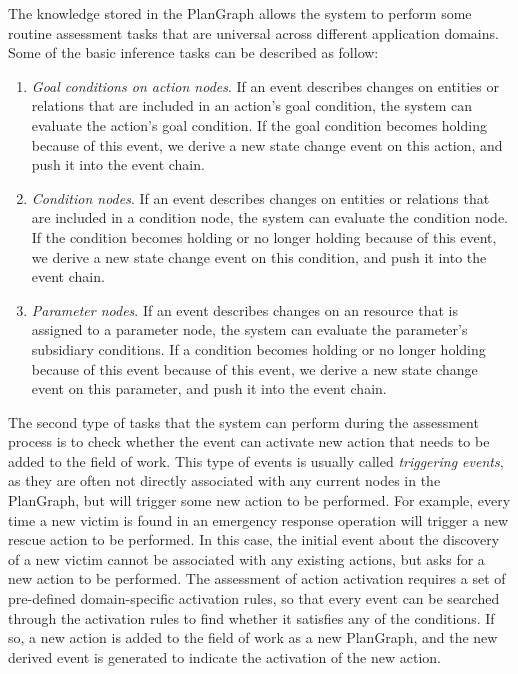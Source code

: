 The knowledge stored in the PlanGraph allows the system to perform some routine assessment tasks that are universal across different application domains. Some of the basic inference tasks can be described as follow:
\begin{enumerate}
	\item \emph{Goal conditions on action nodes}. If an event describes changes on entities or relations that are included in an action's goal condition, the system can evaluate the action's goal condition. If the goal condition becomes holding because of this event, we derive a new state change event on this action, and push it into the event chain.
	\item \emph{Condition nodes}. If an event describes changes on entities or relations that are included in a condition node, the system can evaluate the condition node. If the condition becomes holding or no longer holding because of this event, we derive a new state change event on this condition, and push it into the event chain. 
	\item \emph{Parameter nodes}. If an event describes changes on an resource that is assigned to a parameter node, the system can evaluate the parameter's subsidiary conditions. If a  condition becomes holding or no longer holding because of this event because of this event, we derive a new state change event on this parameter, and push it into the event chain.
\end{enumerate}

The second type of tasks that the system can perform during the assessment process is to check whether the event can activate new action that needs to be added to the field of work. This type of events is usually called \emph{triggering events}, as they are often not directly associated with any current nodes in the PlanGraph, but will trigger some new action to be performed. For example, every time a new victim is found in an emergency response operation will trigger a new rescue action to be performed. In this case, the initial event about the discovery of a new victim cannot be associated with any existing actions, but asks for a new action to be performed. The assessment of action activation requires a set of pre-defined domain-specific activation rules, so that every event can be searched through the activation rules to find whether it satisfies any of the conditions. If so, a new action is added to the field of work as a new PlanGraph, and the new derived event is generated to indicate the activation of the new action.

